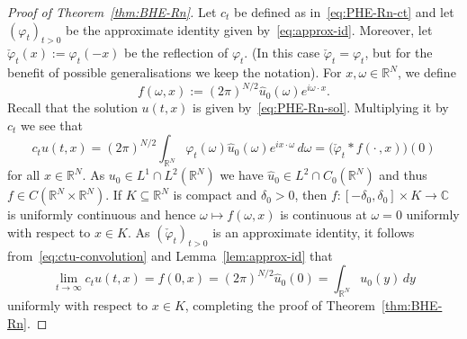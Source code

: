 \documentclass[a4paper, reqno]{amsart}
\numberwithin{equation}{section}
\theoremstyle{plain}
\theoremstyle{definition}
\theoremstyle{remark}
\newcommand{\RR}{\mathbb{R}}
\newcommand{\CC}{\mathbb{C}}
\begin{document}
\begin{proof}[Proof of Theorem~\ref{thm:BHE-Rn}]
  Let $c_t$ be defined as in~\eqref{eq:PHE-Rn-ct} and let $(\varphi_t)_{t>0}$ be the approximate identity given by~\eqref{eq:approx-id}. Moreover, let $\check\varphi_t(x):=\varphi_t(-x)$ be the reflection of $\varphi_t$. (In this case $\check\varphi_t=\varphi_t$, but for the benefit of possible generalisations we keep the notation). For $x,\omega\in\RR^N$, we define
  \begin{equation*}
    f(\omega,x):=(2\pi)^{N/2}\widehat{u}_0(\omega)e^{i\omega\cdot x}.
  \end{equation*}
  Recall that the solution $u(t,x)$ is given by~\eqref{eq:PHE-Rn-sol}. Multiplying it by $c_t$ we see that
  \begin{equation}
    \label{eq:ctu-convolution}
    c_tu(t,x)
    =(2\pi)^{N/2}\int_{\RR^N}\varphi_t(\omega)\hat u_0(\omega)e^{ix\cdot\omega}\,d\omega
    =\bigl(\check\varphi_t*f(\cdot\,,x)\bigr)(0)
  \end{equation}
  for all $x\in\RR^N$. As $u_0\in L^1\cap L^2(\RR^N)$ we have $\widehat{u}_0\in L^2\cap C_0(\RR^N)$ and thus $f\in C(\RR^N\times\RR^N)$. If $K\subseteq\RR^N$ is compact and $\delta_0>0$, then $f\colon[-\delta_0,\delta_0]\times K\to\CC$ is uniformly continuous and hence $\omega\mapsto f(\omega,x)$ is continuous at $\omega=0$ uniformly with respect to $x\in K$. As $(\check\varphi_t)_{t>0}$ is an approximate identity, it follows from~\eqref{eq:ctu-convolution} and Lemma~\ref{lem:approx-id} that
  \begin{equation*}
    \lim_{t\to\infty}c_tu(t,x)
    =f(0,x)
    =(2\pi)^{N/2}\widehat{u}_0(0)
    =\int_{\RR^N}u_0(y)\,dy
  \end{equation*}
  uniformly with respect to $x\in K$, completing the proof of Theorem~\ref{thm:BHE-Rn}.
\end{proof}
\end{document}
